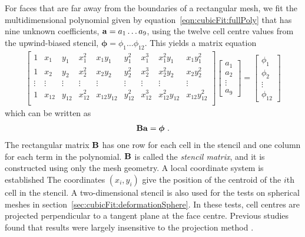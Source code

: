 For faces that are far away from the boundaries of a rectangular mesh, we fit the multidimensional polynomial given by equation~\eqref{eqn:cubicFit:fullPoly} that has nine unknown coefficients, $\mathbf{a} = a_1 \ldots a_9$, using the twelve cell centre values from the upwind-biased stencil, $\bm{\phi} = \phi_1 \ldots \phi_{12}$.  This yields a matrix equation
\begin{align}
	\begin{bmatrix}
		1 & x_1 & y_1 & x_1^2 & x_1 y_1 & y_1^2 & x_1^3 & x_1^2 y_1 & x_1 y_1^2 \\
		1 & x_2 & y_2 & x_2^2 & x_2 y_2 & y_2^2 & x_2^3 & x_2^2 y_2 & x_2 y_2^2 \\
		\vdots & \vdots & \vdots & \vdots & \vdots & \vdots & \vdots & \vdots & \vdots \\
		1 & x_{12} & y_{12} & x_{12}^2 & x_{12} y_{12} & y_{12}^2 & x_{12}^3 & x_{12}^2 y_{12} & x_{12} y_{12}^2 \\
	\end{bmatrix}
	\begin{bmatrix}
		a_1 \\
		a_2 \\
		\vdots \\
		a_9
	\end{bmatrix}
	=
	\begin{bmatrix}
		\phi_1 \\
		\phi_2 \\
		\vdots \\
		\phi_{12}
	\end{bmatrix}
\end{align}
which can be written as
\begin{align}
	\mathbf{B} \mathbf{a} = \bm{\phi} \label{eqn:cubicFit:unweightedLeastSquares} \text{ .}
\end{align}
The rectangular matrix $\mathbf{B}$ has one row for each cell in the stencil and one column for each term in the polynomial.  $\mathbf{B}$ is called the \textit{stencil matrix}, and it is constructed using only the mesh geometry.
A local coordinate system is established 
The  coordinates $(x_i, y_i)$ give the position of the centroid of the $i$th cell in the stencil.
A two-dimensional stencil is also used for the tests on spherical meshes in section~\ref{sec:cubicFit:deformationSphere}.  In these tests, cell centres are projected perpendicular to a tangent plane at the face centre.  Previous studies found that results were largely insensitive to the projection method \citep{skamarock-gassmann2011,lashley2002}.

